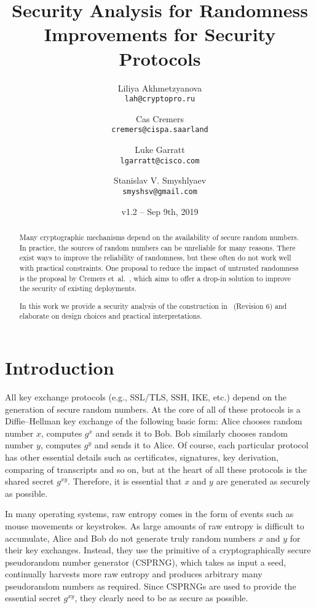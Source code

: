 \documentclass{article}
\author{
  Liliya Akhmetzyanova\\
  \texttt{lah@cryptopro.ru}
  \and
  Cas Cremers\\
  \texttt{cremers@cispa.saarland}
  \and
  Luke Garratt\\
  \texttt{lgarratt@cisco.com}
  \and
  Stanislav V. Smyshlyaev\\
  \texttt{smyshsv@gmail.com}
}
\title{Security Analysis for Randomness Improvements for Security
Protocols}
\date{v1.2 -- Sep 9th, 2019}
\begin{document}
  \maketitle


\begin{abstract}
Many cryptographic mechanisms depend on the availability of secure
	random numbers. In practice, the sources of random numbers can
	be unreliable for many reasons. There exist ways to improve the
	reliability of randomness, but these often do not work well with
	practical constraints.
	One proposal to reduce the impact of untrusted randomness is the
	proposal by Cremers et~al.~\cite{randomnessirtf}, which aims to
	offer a drop-in solution to improve the security of existing deployments. 

	In this work we provide a security analysis of the
	construction in~\cite{randomnessirtf} (Revision 6) and elaborate
	on design choices and practical interpretations.
\end{abstract}

\section{Introduction}
All key exchange protocols (e.g., SSL/TLS, SSH, IKE, etc.) depend on the generation of secure random numbers. At the core of all of these protocols is a Diffie--Hellman key exchange of the following basic form: Alice chooses random number $x$, computes $g^x$ and sends it to Bob. Bob similarly chooses random number $y$, computes $g^y$ and sends it to Alice. Of course, each particular protocol has other essential details such as certificates, signatures, key derivation, comparing of transcripts and so on, but at the heart of all these protocols is the shared secret $g^{xy}$. Therefore, it is essential that $x$ and $y$ are generated as securely as possible. 

In many operating systems, raw entropy comes in the form of events such as mouse movements or keystrokes. As large amounts of raw entropy is difficult to accumulate, Alice and Bob do not generate truly random numbers $x$ and $y$ for their key exchanges. Instead, they use the primitive of a cryptographically secure pseudorandom number generator (CSPRNG), which takes as input a seed, continually harvests more raw entropy and  produces arbitrary many pseudorandom numbers as required. Since CSPRNGs are used to provide the essential secret $g^{xy}$, they clearly need to be as secure as possible. 
\end{document}
